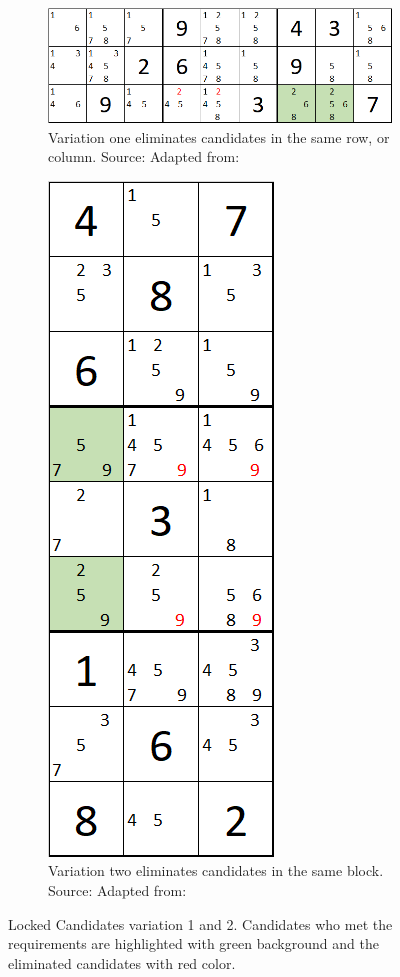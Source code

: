 \documentclass[twoside]{ausarbeitung}
\begin{document}
\begin{figure}[H]
\centering
\begin{subfigure}[t]{.625\textwidth}
  \centering
  \includegraphics[width=\linewidth]{images/lcandidate1}
  \caption{Variation one eliminates candidates in the same row, or column. Source: Adapted from: \cite{SolvingS57:online}}
  \label{fig:lcandidate1}
\end{subfigure}%
\hfill
\begin{subfigure}[t]{.325\textwidth}
  \centering
  \includegraphics[scale=.50]{images/lcandidate2}
  \caption{Variation two eliminates candidates in the same block. Source: Adapted from: \cite{SolvingS57:online}}
  \label{fig:lcandidate2}
\end{subfigure}
\caption[Locked Candidates]{Locked Candidates variation 1 and 2. Candidates who met the requirements are highlighted with green background and the eliminated candidates with red color.}
\label{fig:lcandidate}
\end{figure}
\end{document}
